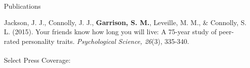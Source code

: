 \documentclass {resume}
\newcommand{\meb}{{\bf Garrison, S. M.}\xspace}
\newlength{\wideitemsep}
\let\olditem\item
\renewcommand{\item}{\setlength{\itemsep}{\wideitemsep}\olditem}
\begin{document}
\begin{rSection}{\textrm{Publications}}%
\begin{etaremune}\item Jackson, J. J., Connolly, J. J., \meb, Leveille, M. M., \& Connolly, S. L. (2015). Your friends know how long you will live: A 75-year study of peer-rated personality traits. \textit{Psychological Science, 26}(3),  335-340.\\ \href{http://pss.sagepub.com/content/early/2015/01/12/0956797614561800.full}{\color{blue}{doi:10.1177/0956797614561800}}\\
{\scriptsize Select Press Coverage: 
}
\end{etaremune}
\end{rSection}
\end{document}
